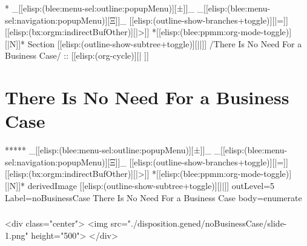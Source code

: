 \begin{whenOrg}
*  _[[elisp:(blee:menu-sel:outline:popupMenu)][±]]_ _[[elisp:(blee:menu-sel:navigation:popupMenu)][Ξ]]_ [[elisp:(outline-show-branches+toggle)][|=]] [[elisp:(bx:orgm:indirectBufOther)][|>]] *[[elisp:(blee:ppmm:org-mode-toggle)][|N]]*  Section    [[elisp:(outline-show-subtree+toggle)][||]]   /There Is No Need For a Business Case/ ::  [[elisp:(org-cycle)][| ]]
\end{whenOrg}

\section{There Is No Need For a Business Case}


\begin{whenOrg}
*****  _[[elisp:(blee:menu-sel:outline:popupMenu)][±]]_ _[[elisp:(blee:menu-sel:navigation:popupMenu)][Ξ]]_ [[elisp:(outline-show-branches+toggle)][|=]] [[elisp:(bx:orgm:indirectBufOther)][|>]] *[[elisp:(blee:ppmm:org-mode-toggle)][|N]]*  derivedImage [[elisp:(outline-show-subtree+toggle)][||]] outLevel=5 Label=noBusinessCase There Is No Need For a Business Case body=enumerate
\end{whenOrg}

\begin{htmlonly}

\begin{frame}[fragile,plain,label=noBusinessCase]
    \frametitle{}
    \framesubtitle{}
    \begin{rawhtml}
<div class="center">
<img src="./disposition.gened/noBusinessCase/slide-1.png" height="500">
</div>
    \end{rawhtml}
\end{frame}
\end{htmlonly}

